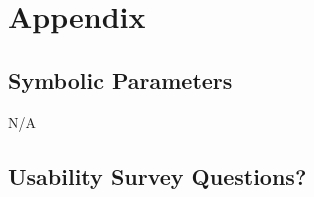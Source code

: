 \documentclass[12pt, titlepage]{article}
\begin{document}



\newpage
				






\newpage

\section{Appendix} \label{section:6}

\subsection{Symbolic Parameters}  \label{section:6.1}

N/A

\subsection{Usability Survey Questions?} \label{section:6.2}

\end{document}
